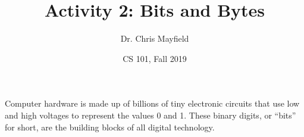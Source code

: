 \documentclass[12pt]{article}
\title{Activity 2: Bits and Bytes}
\author{Dr. Chris Mayfield}
\date{CS 101, Fall 2019}
\begin{document}
\maketitle

Computer hardware is made up of billions of tiny electronic circuits that use low and high voltages to represent the values 0 and 1.
These binary digits, or ``bits'' for short, are the building blocks of all digital technology.



\end{document}
